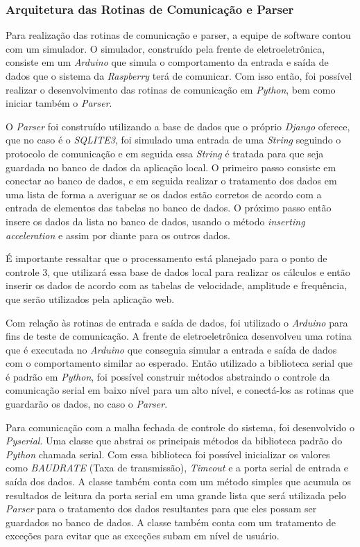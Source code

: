 \subsubsection*{\textbf{Arquitetura das Rotinas de Comunicação e Parser}} \label{software:rotinas}

Para realização das rotinas de comunicação e parser, a equipe de software contou com um simulador. O simulador, construído pela frente de eletroeletrônica, 
consiste em um \textit{Arduino} que simula o comportamento da entrada e saída de dados que o sistema da \textit{Raspberry} terá de comunicar. Com isso 
então, foi possível realizar o desenvolvimento das rotinas de comunicação em \textit{Python}, bem como iniciar também o \textit{Parser}.

O \textit{Parser} foi construído utilizando a base de dados que o próprio \textit{Django} oferece, que no caso é o \textit{SQLITE3}, foi simulado uma 
entrada de uma \textit{String} seguindo o protocolo de comunicação e em seguida essa \textit{String} é tratada para que seja guardada no banco de dados 
da aplicação local. O primeiro passo consiste em conectar ao banco de dados, e em seguida realizar o tratamento dos dados em uma lista de forma a 
averiguar se os dados estão corretos de acordo com a entrada de elementos das tabelas no banco de dados. O próximo passo então insere os dados da lista 
no banco de dados, usando o método \textit{inserting acceleration} e assim por diante para os outros dados.

É importante ressaltar que o processamento está planejado para o ponto de controle 3, que utilizará essa base de dados local para realizar os cálculos 
e então inserir os dados de acordo com as tabelas de velocidade, amplitude e frequência, que serão utilizados pela aplicação web.

Com relação às rotinas de entrada e saída de dados, foi utilizado o \textit{Arduino} para fins de teste de comunicação. A frente de eletroeletrônica 
desenvolveu uma rotina que é executada no \textit{Arduino} que conseguia simular a entrada e saída de dados com o comportamento similar ao esperado. 
Então utilizado a biblioteca serial que é padrão em \textit{Python}, foi possível construir métodos abstraindo o controle da comunicação serial em baixo
nível para um alto nível, e conectá-los as rotinas que guardarão os dados, no caso o \textit{Parser}.

Para comunicação com a malha fechada de controle do sistema, foi desenvolvido o \textit{Pyserial}. Uma classe que abstrai os principais métodos da 
biblioteca padrão do \textit{Python} chamada serial. Com essa biblioteca foi possível inicializar os valores como \textit{BAUDRATE} (Taxa de transmissão),
\textit{Timeout} e a porta serial de entrada e saída dos dados. A classe também conta com um método simples que acumula os resultados de leitura da porta 
serial em uma grande lista que será utilizada pelo \textit{Parser} para o tratamento dos dados resultantes para que eles possam ser guardados no banco de 
dados. A classe também conta com um tratamento de exceções para evitar que as exceções subam em nível de usuário.

